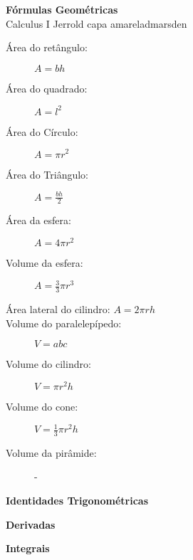 \cleardoublepage\documentclass[../main.tex]{subfiles}
\begin{document}
\begin{center}
    \textbf{Fórmulas Geométricas}\\
    Calculus I Jerrold capa amareladmarsden\cite{Marsdeng} 
\end{center}
\begin{description}
    \item[Área do retângulo:] $A=b h$
    \item[Área do quadrado:] $A=l^2$
    \item[Área do Círculo:] $A=\pi r^2$
    \item[Área do Triângulo:] $A=\frac{b h}{2}$
    \item[Área da esfera:] $A=4\pi r^2$
    \item[Volume da esfera:] $A=\frac{3}{3}\pi r^3$
    \item[Área lateral do cilindro: $A=2\pi r h$]
    \item[Volume do paralelepípedo:] $V=abc$
    \item[Volume do cilindro:] $V=\pi r^2h$
    \item[Volume do cone:] $V=\frac{1}{3}\pi r^2 h$
    \item[Volume da pirâmide:] -
\end{description}
\begin{center}
    \textbf{Identidades Trigonométricas}
\end{center}


\begin{center}
    \textbf{Derivadas}
\end{center}

\begin{center}
    \textbf{Integrais}
\end{center}
\end{document}
